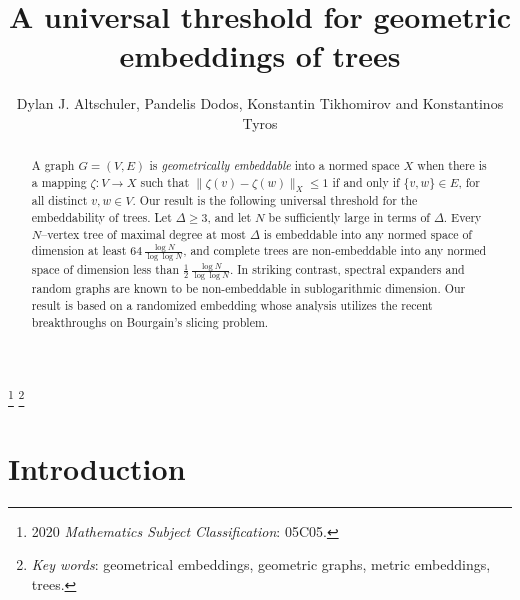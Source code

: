 \documentclass[11pt,leqno]{amsart}
\theoremstyle{remark}
\theoremstyle{plain}
\begin{document}
\title[A universal threshold for geometric embeddings of trees]{A universal threshold for geometric embeddings of trees}

\author{Dylan J. Altschuler, Pandelis Dodos, Konstantin Tikhomirov and Konstantinos Tyros}

\address{Department of Mathematical Sciences, Carnegie Mellon University}

\address{Department of Mathematics, University of Athens, Panepistimiopolis 157 84, Athens, Greece}

\address{Department of Mathematical Sciences, Carnegie Mellon University}

\address{Department of Mathematics, University of Athens, Panepistimiopolis 157 84, Athens, Greece}

\thanks{2020 \textit{Mathematics Subject Classification}: 05C05.}
\thanks{\textit{Key words}: geometrical embeddings, geometric graphs, metric embeddings, trees.}


\begin{abstract}
A graph $G=(V,E)$ is {\it geometrically embeddable} into a normed space $X$ when there is a mapping $\zeta\colon V\to X$ such that
$\|\zeta(v)-\zeta(w)\|_X\leqslant 1$ if and only if $\{v,w\}\in E$, for all distinct $v,w\in V$. Our result is the following universal threshold for the embeddability of trees. Let $\Delta \geqslant 3$, and let $N$ be sufficiently large in terms of $\Delta$. Every $N$--vertex tree of maximal degree at most $\Delta$ is embeddable into any normed space of dimension at least $64\,\frac{\log N}{\log\log N}$, and complete trees are non-embeddable into any normed space of dimension less than $\frac{1}{2}\,\frac{\log N}{\log\log N}$. In striking contrast, spectral expanders and random graphs are known to be non-embeddable in sublogarithmic dimension. Our result is based on a randomized embedding whose analysis utilizes the recent breakthroughs on Bourgain's slicing problem.
\end{abstract}

\maketitle


\section{Introduction} \label{sec1}
\end{document}
